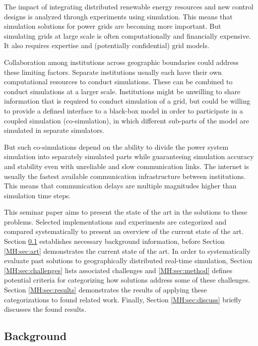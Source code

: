 \documentclass[a4paper]{atseminar}
\begin{document}
The impact of integrating distributed renewable energy resources and new control designs is analyzed through experiments using simulation. This means that simulation solutions for power grids are becoming more important. But simulating grids at large scale is often computationally and financially expensive. It also requires expertise and (potentially confidential) grid models. 

Collaboration among institutions across geographic boundaries could address these limiting factors. 
Separate institutions usually each have their own computational resources to conduct simulations. These can be combined to conduct simulations at a larger scale.
Institutions might be unwilling to share information that is required to conduct simulation of a grid, but could be willing to provide a defined interface to a black-box model in order to participate in a coupled simulation (co-simulation), in which different sub-parts of the model are simulated in separate simulators.

But such co-simulations depend on the ability to divide the power system simulation into separately simulated parts while guaranteeing simulation accuracy and stability even with unreliable and slow communication links. The internet is usually the fastest available communication infrastructure between institutions. This means that communication delays are multiple magnitudes higher than simulation time steps.

This seminar paper aims to present the state of the art in the solutions to these problems. Selected implementations and experiments are categorized and compared systematically to present an overview of the current state of the art. Section \ref{MH:sec:bg} establishes necessary background information, before Section \ref{MH:sec:art} demonstrates the current state of the art. In order to systematically evaluate past solutions to geographically distributed real-time simulation, Section \ref{MH:sec:challenges} lists associated challenges and \ref{MH:sec:method} defines potential criteria
for categorizing how solutions address some of these challenges. Section \ref{MH:sec:results} demonstrates the results of applying these categorizations to found related work. Finally, Section \ref{MH:sec:discuss} briefly discusses the found results.


\subsection{Background}
\label{MH:sec:bg}
\end{document}
